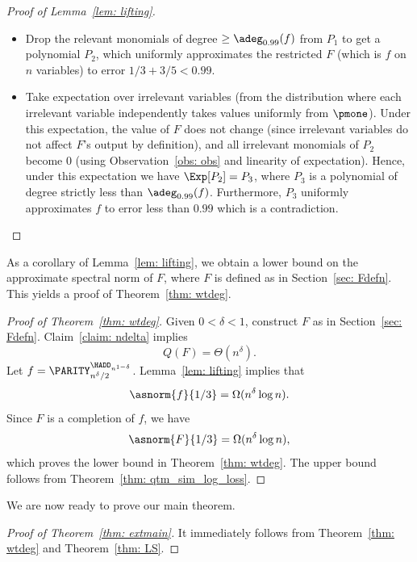 \begin{proof}[Proof of Lemma~\ref{lem: lifting}]
\begin{itemize}
    \item Drop the relevant monomials of degree $\geq \adeg_{0.99}(f)$ from $P_1$ to get a polynomial $P_2$, which uniformly approximates the restricted $F$ (which is $f$ on $n$ variables) to error $1/3 + 3/5 < 0.99$.
    \item Take expectation over irrelevant variables (from the distribution where each irrelevant variable independently takes values uniformly from $\pmone$).  Under this expectation, the value of $F$ does not change (since irrelevant variables do not affect $F$'s output by definition), and all irrelevant monomials of $P_2$ become 0 (using Observation~\ref{obs: obs} and linearity of expectation).  Hence, under this expectation we have $\Exp[P_2] = P_3$, where $P_3$ is a polynomial of degree strictly less than $\adeg_{0.99}(f)$.  Furthermore, $P_3$ uniformly approximates $f$ to error less than $0.99$ which is a contradiction. 
\end{itemize}
\end{proof}


As a corollary of Lemma~\ref{lem: lifting}, we obtain a lower bound on the approximate spectral norm of $F$, where $F$ is defined as in Section~\ref{sec: Fdefn}.  This yields a proof of Theorem~\ref{thm: wtdeg}.

\begin{proof}[Proof of Theorem~\ref{thm: wtdeg}]
Given $0 < \delta < 1$, construct $F$ as in Section~\ref{sec: Fdefn}.  Claim~\ref{claim: ndelta} implies 
\[
Q(F) = \Theta(n^{\delta}).
\]
Let $f = \PARITY_{n^{\delta}/2}^{\HADD_{n^{1 - \delta}}}$.  Lemma~\ref{lem: lifting} implies that 
\[
\asnorm{f}{1/3} = \Omega(n^{\delta} \log n).
\]
Since $F$ is a completion of $f$, we have 
\[
\asnorm{F}{1/3} = \Omega(n^{\delta} \log n),
\]
which proves the lower bound in Theorem~\ref{thm: wtdeg}.  The upper bound follows from Theorem~\ref{thm: qtm_sim_log_loss}.
\end{proof}

We are now ready to prove our main theorem.
\begin{proof}[Proof of Theorem~\ref{thm: extmain}]
It immediately follows from Theorem~\ref{thm: wtdeg} and Theorem~\ref{thm: LS}.
\end{proof}

